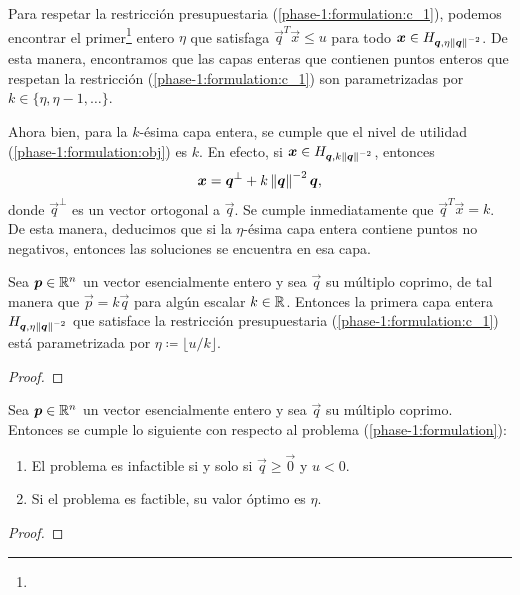 Para respetar la restricción presupuestaria (\ref{phase-1:formulation:c_1}), podemos encontrar el
primer\footnote{
} entero $\eta$ que satisfaga $\vec{q}^T\vec{x} \leq u$ para todo $\boldsymbol{x} \in H_{\boldsymbol{q},
\eta\left\lVert \boldsymbol{q} \right\rVert^{-2}}$. De esta manera, encontramos que las capas enteras que contienen puntos
enteros que respetan la restricción (\ref{phase-1:formulation:c_1}) son parametrizadas por $k \in
\lbrace \eta, \eta - 1, \ldots \rbrace$.

Ahora bien, para la $k$-ésima capa entera, se cumple que el nivel de utilidad
(\ref{phase-1:formulation:obj}) es $k$. En efecto, si $\boldsymbol{x} \in H_{\boldsymbol{q},
k\left\lVert \boldsymbol{q} \right\rVert^{-2}}$, entonces
\begin{equation*}
	\boldsymbol{x} = \boldsymbol{q}^{\perp} + k\left\lVert \boldsymbol{q} \right\rVert^{-2}\boldsymbol{q},
\end{equation*}
donde $\vec{q}^{\perp}$ es un vector ortogonal a $\vec{q}$. Se cumple inmediatamente que
$\vec{q}^T\vec{x} = k$. De esta manera, deducimos que si la $\eta$-ésima capa entera contiene puntos
no negativos, entonces las soluciones se encuentra en esa capa.

\begin{lemma}
	\label{phase-1:lemma:eta}
	Sea $\boldsymbol{p} \in \mathbb{R}^n$ un vector esencialmente entero y sea $\vec{q}$ su múltiplo coprimo, de
	tal manera que $\vec{p} = k\vec{q}$ para algún escalar $k \in \mathbb{R}$. Entonces la primera capa
	entera $H_{\boldsymbol{q}, \eta \left\lVert \boldsymbol{q} \right\rVert^{-2}}$ que satisface la restricción presupuestaria
	(\ref{phase-1:formulation:c_1}) está parametrizada por $\eta \coloneq \lfloor u/k \rfloor$.
\end{lemma}
\begin{proof}
\end{proof}

\begin{theorem}
	\label{phase-1:th:feasibility}
	Sea $\boldsymbol{p} \in \mathbb{R}^n$ un vector esencialmente entero y sea $\vec{q}$ su múltiplo coprimo.
	Entonces se cumple lo siguiente con respecto al problema (\ref{phase-1:formulation}):
	\begin{enumerate}
		\item El problema es infactible si y solo si $\vec{q} \geq \vec{0}$ y $u < 0$.
		\item Si el problema es factible, su valor óptimo es $\eta$.
	\end{enumerate}
\end{theorem}
\begin{proof}
\end{proof}

